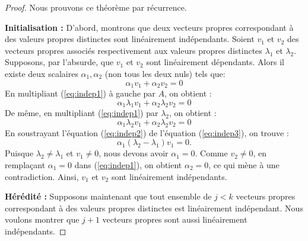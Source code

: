 \documentclass[12pt]{report}
\begin{document}
\begin{proof}
    Nous prouvons ce théorème par récurrence.

    \textbf{Initialisation :} D'abord, montrons que deux vecteurs propres correspondant à des valeurs propres distinctes sont linéairement indépendants. Soient $v_1$ et $v_2$ des vecteurs propres associés respectivement aux valeurs propres distinctes $\lambda_1$ et $\lambda_2$. Supposons, par l'absurde, que $v_1$ et $v_2$ sont linéairement dépendants. Alors il existe deux scalaires $\alpha_1, \alpha_2$ (non tous les deux nuls) tels que:
    \begin{equation} \label{eq:indep1}
        \alpha_1 v_1 + \alpha_2 v_2 = 0
    \end{equation}
    En multipliant (\ref{eq:indep1}) à gauche par $A$, on obtient :
    \begin{equation} \label{eq:indep2}
        \alpha_1 \lambda_1 v_1 + \alpha_2 \lambda_2 v_2 = 0
    \end{equation}
    De même, en multipliant (\ref{eq:indep1}) par $\lambda_2$, on obtient :
    \begin{equation} \label{eq:indep3}
        \alpha_1 \lambda_2 v_1 + \alpha_2 \lambda_2 v_2 = 0
    \end{equation}
    En soustrayant l'équation (\ref{eq:indep2}) de l'équation (\ref{eq:indep3}), on trouve :
    \[
        \alpha_1 (\lambda_2 - \lambda_1) v_1 = 0.
    \]
    Puisque $\lambda_2 \neq \lambda_1$ et $v_1 \neq 0$, nous devons avoir $ \alpha_1 = 0$. Comme $v_2 \neq 0$, en remplaçant $\alpha_1=0$ dans (\ref{eq:indep1}), on obtient $\alpha_2=0$, ce qui mène à une contradiction. Ainsi, $v_1$ et $v_2$ sont linéairement indépendants.

    \textbf{Hérédité :} Supposons maintenant que tout ensemble de $j < k$ vecteurs propres correspondant à des valeurs propres distinctes est linéairement indépendant. Nous voulons montrer que $j+1$ vecteurs propres sont aussi linéairement indépendants.


\end{proof}
\end{document}
